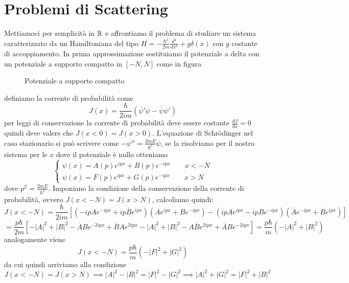 \section{Problemi di Scattering}
Mettiamoci per semplicità in $\mathbb{R}$ e affrontiamo il problema di studiare un sistema caratterizzato da un Hamiltoniana del tipo $H = -\frac{\hbar^2}{2m}\frac{d^2}{dx^2} + g\delta(x)$ con $g$ costante di accoppiamento. In prima approssimazione sostituiamo il potenziale a delta con un potenziale a supporto compatto in $[-N,N]$ come in figura
\begin{figure}[H]
\centering
{}
\caption{Potenziale a supporto compatto}
\end{figure}
definiamo la corrente di probabilità come 
\[J(x) = \frac{\hbar}{2im}(\overline{\psi}'\psi - \overline{\psi}\psi')\]
per leggi di conservazione la corrente di probabilità deve essere costante $\frac{dJ}{dx} = 0$ quindi deve valere che $J(x<0) = J(x>0)$. L'equazione di Schr{\"o}dinger nel caso stazionario si può scrivere come $-\psi'' = \frac{2mE}{\hbar^2}\psi$, se la risolviamo per il nostro sistema per le $x$ dove il potenziale è nullo otteniamo
\[\begin{cases}
\psi(x) = A(p)e^{ipx} +B(p) e^{-ipx} \qquad x<-N \\
\psi(x) = F(p)e^{ipx} +G(p) e^{-ipx} \qquad x>N
\end{cases}\]
dove $p^2 = \frac{2mE}{\hbar^2}$. Imponiano la condizione della conservazione della corrente di probabilità, ovvero $J(x<-N) = J(x>N)$, calcoliamo quindi:
\[J(x<-N) = \frac{\hbar}{2im}\left[(-ip\overline{A}e^{-ipx}+ip\overline{B}e^{ipx})( Ae^{ipx} +Be^{-ipx}) -(ipAe^{ipx} -ipBe^{-ipx})(\overline{A}e^{-ipx} +\overline{B}e^{ipx} )  \right]\]
\[= \frac{p\hbar}{2m}\left[-|A|^2 + |B|^2 -\overline{A}Be^{-2ipx} +\overline{B}Ae^{2ipx} - |A|^2 + |B|^2 - A\overline{B}e^{2ipx} + \overline{A}Be^{-2ipx}\right] = \frac{p\hbar}{m}(-|A|^2 + |B|^2)\]
analogamente viene
\[J(x<-N) = \frac{p\hbar}{m}(-|F|^2 + |G|^2)\]
da cui quindi arriviamo alla condizione
\[J(x<-N) = J(x>N)\implies|A|^2-|B|^2 = |F|^2 - |G|^2 \implies |A|^2+|G|^2 = |F|^2 + |B|^2\]
